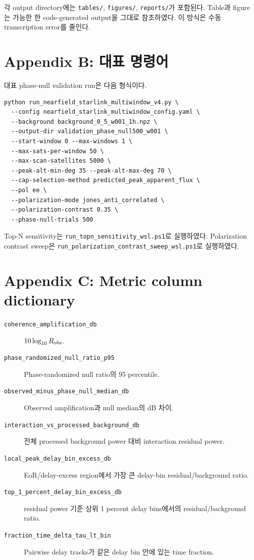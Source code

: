 \documentclass[11pt,a4paper]{article}
\begin{document}
각 output directory에는 \texttt{tables/}, \texttt{figures/}, \texttt{reports/}가 포함된다.
Table과 figure는 가능한 한 code-generated output을 그대로 참조하였다.
이 방식은 수동 transcription error를 줄인다.

\section{Appendix B: 대표 명령어}

대표 phase-null validation run은 다음 형식이다.
\begin{verbatim}
python run_nearfield_starlink_multiwindow_v4.py \
  --config nearfield_starlink_multiwindow_config.yaml \
  --background background_0_5_w001_1h.npz \
  --output-dir validation_phase_null500_w001 \
  --start-window 0 --max-windows 1 \
  --max-sats-per-window 50 \
  --max-scan-satellites 5000 \
  --peak-alt-min-deg 35 --peak-alt-max-deg 70 \
  --cap-selection-method predicted_peak_apparent_flux \
  --pol ee \
  --polarization-mode jones_anti_correlated \
  --polarization-contrast 0.35 \
  --phase-null-trials 500
\end{verbatim}

Top-N sensitivity는 \texttt{run\_topn\_sensitivity\_wsl.ps1}로 실행하였다.
Polarization contrast sweep은 \texttt{run\_polarization\_contrast\_sweep\_wsl.ps1}로 실행하였다.

\section{Appendix C: Metric column dictionary}

\begin{description}
  \item[\texttt{coherence\_amplification\_db}]
  $10\log_{10} R_{\rm obs}$.
  \item[\texttt{phase\_randomized\_null\_ratio\_p95}]
  Phase-randomized null ratio의 95 percentile.
  \item[\texttt{observed\_minus\_phase\_null\_median\_db}]
  Observed amplification과 null median의 dB 차이.
  \item[\texttt{interaction\_vs\_processed\_background\_db}]
  전체 processed background power 대비 interaction residual power.
  \item[\texttt{local\_peak\_delay\_bin\_excess\_db}]
  EoR/delay-excess region에서 가장 큰 delay-bin residual/background ratio.
  \item[\texttt{top\_1\_percent\_delay\_bin\_excess\_db}]
  residual power 기준 상위 1 percent delay bins에서의 residual/background ratio.
  \item[\texttt{fraction\_time\_delta\_tau\_lt\_bin}]
  Pairwise delay tracks가 같은 delay bin 안에 있는 time fraction.
\end{description}
\end{document}
